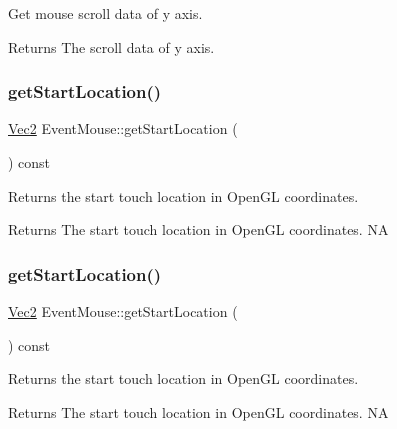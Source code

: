 Get mouse scroll data of y axis.

\begin{DoxyReturn}{Returns}
The scroll data of y axis. 
\end{DoxyReturn}
\mbox{\label{classEventMouse_a9fdfb69f542e2f9e879db6552e8f656a}} 
\subsubsection{\texorpdfstring{get\+Start\+Location()}{getStartLocation()}\hspace{0.1cm}{\footnotesize\ttfamily [1/2]}}
{\footnotesize\ttfamily \hyperlink{classVec2}{Vec2} Event\+Mouse\+::get\+Start\+Location (\begin{DoxyParamCaption}{ }\end{DoxyParamCaption}) const}

Returns the start touch location in Open\+GL coordinates.

\begin{DoxyReturn}{Returns}
The start touch location in Open\+GL coordinates.  NA 
\end{DoxyReturn}
\mbox{\label{classEventMouse_a9fdfb69f542e2f9e879db6552e8f656a}} 
\subsubsection{\texorpdfstring{get\+Start\+Location()}{getStartLocation()}\hspace{0.1cm}{\footnotesize\ttfamily [2/2]}}
{\footnotesize\ttfamily \hyperlink{classVec2}{Vec2} Event\+Mouse\+::get\+Start\+Location (\begin{DoxyParamCaption}{ }\end{DoxyParamCaption}) const}

Returns the start touch location in Open\+GL coordinates.

\begin{DoxyReturn}{Returns}
The start touch location in Open\+GL coordinates.  NA 
\end{DoxyReturn}
\mbox{\label{classEventMouse_a47cfa1bc5a0f367dd844d64c88ad697c}} 
